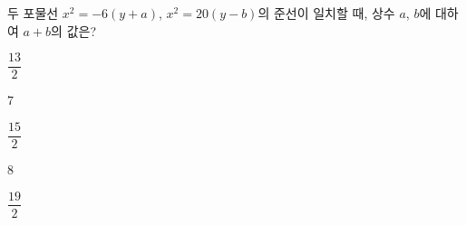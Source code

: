 두 포물선 $x^2=-6(y+a)$, $x^2=20(y-b)$의 준선이 일치할 때, 상수 $a$, $b$에 대하여 $a+b$의 값은?
\begin{choices32}{\rule[-3ex]{0pt}{8ex}$\dfrac{13}{2}$}{\rule[-3ex]{0pt}{8ex}$7$}{\rule[-3ex]{0pt}{8ex}$\dfrac{15}{2}$}{\rule[-3ex]{0pt}{8ex}$8$}{\rule[-3ex]{0pt}{8ex}$\dfrac{19}{2}$}\end{choices32}
